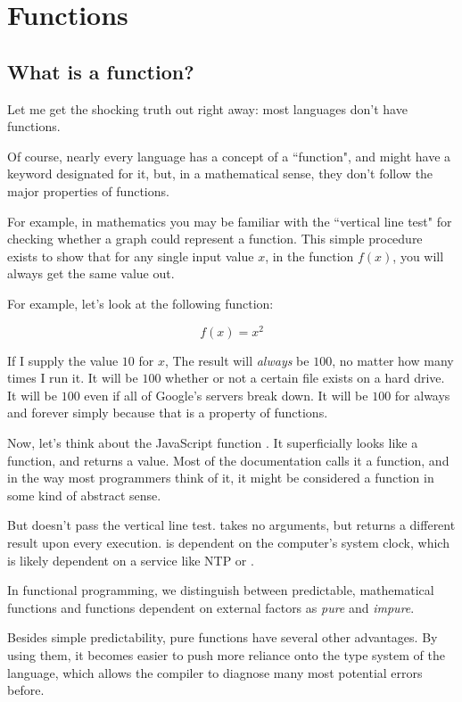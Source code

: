 \chapter{Functions}
\section{What is a function?}
Let me get the shocking truth out right away: most languages don't have functions.  

Of course, nearly every language has a concept of a ``function", and might have a keyword designated for it, but, in a mathematical sense, they don't follow the major properties of functions.  

For example, in mathematics you may be familiar with the ``vertical line test" for checking whether a graph could represent a function. This simple procedure exists to show that for any single input value $ x $, in the function $f\left(x\right)$, you will always get the same value out.  

For example, let's look at the following function: 

$$ f\left( x \right) = x ^ 2 $$ 

If I supply the value $ 10 $ for $ x $, The result will \textit{always} be $ 100 $, no matter how many times I run it.  It will be $ 100 $ whether or not a certain file exists on a hard drive. It will be $100$ even if all of Google's servers break down.  It will be $100$ for always and forever simply because that is a property of functions. 

Now, let's think about the JavaScript function .  It superficially looks like a function, and returns a value.  Most of the documentation calls it a function, and in the way most programmers think of it, it might be considered a function in some kind of abstract sense. 

But  doesn't pass the vertical line test.  takes no arguments, but returns a different result upon every execution.   is dependent on the computer's system clock, which is likely dependent on a service like NTP or . 


In functional programming, we distinguish between predictable, mathematical functions and functions dependent on external factors as \textit{pure} and \textit{impure}.  

Besides simple predictability, pure functions have several other advantages.  By using them, it becomes easier to push more reliance onto the type system of the language, which allows the compiler to diagnose many most potential errors before. 
